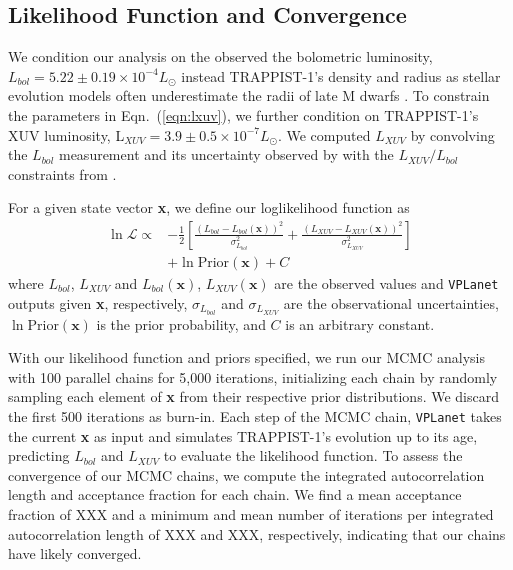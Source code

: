\documentclass[twocolumn]{aastex62}
\newcommand{\vplanet}[0]{\texttt{VPLanet}\xspace}
\begin{document}
\subsection{Likelihood Function and Convergence}

We condition our analysis on the observed the bolometric luminosity, $L_{bol} = 5.22 \pm{0.19} \times 10^{-4} L_{\odot}$ instead TRAPPIST-1's density and radius as stellar evolution models often underestimate the radii of late M dwarfs \citep{Reid2005,Spada2013,Jackson2019}. To constrain the parameters in Eqn.~(\ref{eqn:lxuv}), we further condition on TRAPPIST-1's XUV luminosity, L$_{XUV} = 3.9 \pm{0.5} \times 10^{-7} L_{\odot}$. We computed $L_{XUV}$ by convolving the $L_{bol}$ measurement and its uncertainty observed by \citet{vanGrootel2018} with the $L_{XUV}/L_{bol}$ constraints from \citet{Wheatley2017}.

For a given state vector \textbf{x}, we define our loglikelihood function as
\small
\begin{equation} \label{eqn:lnlike}
\begin{split}
    \ln \mathcal{L} \propto & -\frac{1}{2} \left[ \frac{(L_{bol} - L_{bol}(\textbf{x}))^2}{\sigma_{L_{bol}}^2} + \frac{(L_{XUV} - L_{XUV}(\textbf{x}))^2}{\sigma_{L_{XUV}}^2} \right] \\
    & + \ln \mathrm{Prior}(\textbf{x}) + C
\end{split}
\end{equation}
\normalsize
where $L_{bol}$, $L_{XUV}$ and $L_{bol}(\textbf{x})$, $L_{XUV}(\textbf{x})$ are the observed values and \vplanet outputs given \textbf{x}, respectively, $\sigma_{L_{bol}}$ and $\sigma_{L_{XUV}}$ are the observational uncertainties, $\ln \mathrm{Prior}(\textbf{x})$ is the prior probability, and $C$ is an arbitrary constant. 

With our likelihood function and priors specified, we run our MCMC analysis with 100 parallel chains for 5,000 iterations, initializing each chain by randomly sampling each element of \textbf{x} from their respective prior distributions. We discard the first 500 iterations as burn-in.  Each step of the MCMC chain, \vplanet takes the current \textbf{x} as input and simulates TRAPPIST-1's evolution up to its age, predicting $L_{bol}$ and $L_{XUV}$ to evaluate the likelihood function. To assess the convergence of our MCMC chains, we compute the integrated autocorrelation length and acceptance fraction for each chain. We find a mean acceptance fraction of XXX and a minimum and mean number of iterations per integrated autocorrelation length of XXX and XXX, respectively, indicating that our chains have likely converged.
\end{document}
